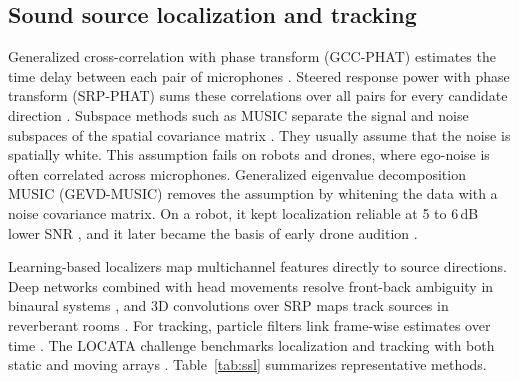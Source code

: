 \documentclass{svproc}
\begin{document}
\subsection{Sound source localization and tracking}
Generalized cross-correlation with phase transform (GCC-PHAT) estimates the time delay between each pair of microphones \cite{knapp1976gcc}.
Steered response power with phase transform (SRP-PHAT) sums these correlations over all pairs for every candidate direction \cite{dibiase2000srp}.
Subspace methods such as MUSIC separate the signal and noise subspaces of the spatial covariance matrix \cite{schmidt1986music}.
They usually assume that the noise is spatially white.
This assumption fails on robots and drones, where ego-noise is often correlated across microphones.
Generalized eigenvalue decomposition MUSIC (GEVD-MUSIC) removes the assumption by whitening the data with a noise covariance matrix.
On a robot, it kept localization reliable at 5 to 6\,dB lower SNR \cite{nakamura2011gevd}, and it later became the basis of early drone audition \cite{okutani2012quadrocopter,furukawa2013ncm}.

Learning-based localizers map multichannel features directly to source directions.
Deep networks combined with head movements resolve front-back ambiguity in binaural systems \cite{ma2017binaural}, and 3D convolutions over SRP maps track sources in reverberant rooms \cite{diazguerra2021cross3d}.
For tracking, particle filters link frame-wise estimates over time \cite{valin2007tracking}.
The LOCATA challenge benchmarks localization and tracking with both static and moving arrays \cite{evers2020locata}.
Table~\ref{tab:ssl} summarizes representative methods.
\end{document}
